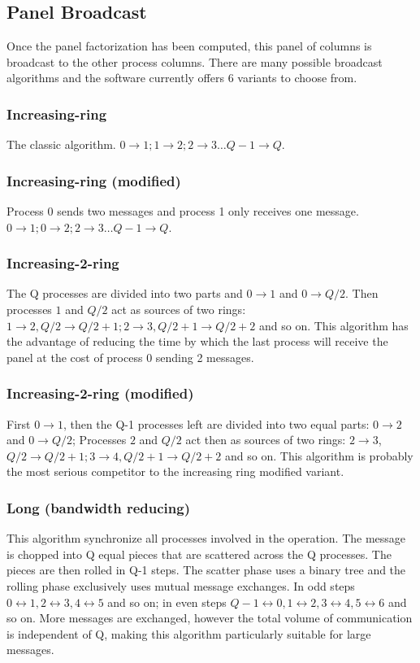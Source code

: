 \documentclass[a4paper, 11pt]{article}
\begin{document}
\subsection{Panel Broadcast}

Once the panel factorization has been computed, this panel of columns is broadcast to the other process columns. There are many possible broadcast algorithms and the software currently offers 6 variants to choose from.

\subsubsection{Increasing-ring}
The classic algorithm. $0 \rightarrow 1; 1 \rightarrow 2; 2 \rightarrow 3 \dots Q-1 \rightarrow Q$.

\subsubsection{Increasing-ring (modified)}
Process 0 sends two messages and process 1 only receives one message. $0 \rightarrow 1; 0 \rightarrow 2; 2 \rightarrow 3 \dots Q-1 \rightarrow Q$. 

\subsubsection{Increasing-2-ring}
The Q processes are divided into two parts and $0 \rightarrow 1$ and $0 \rightarrow Q/2$. Then processes $1$ and $Q/2$ act as sources of two rings: $1 \rightarrow 2, Q/2 \rightarrow Q/2+1; 2 \rightarrow 3, Q/2+1 \rightarrow Q/2+2$ and so on. This algorithm has the advantage of reducing the time by which the last process will receive the panel at the cost of process $0$ sending 2 messages.

\subsubsection{Increasing-2-ring (modified)}
First $0 \rightarrow 1$, then the Q-1 processes left are divided into two equal parts: $0 \rightarrow 2$ and $0 \rightarrow Q/2$; Processes $2$ and $Q/2$ act then as sources of two rings: $2 \rightarrow 3$, $Q/2 \rightarrow Q/2+1; 3 \rightarrow 4, Q/2+1 \rightarrow Q/2+2$ and so on. This algorithm is probably the most serious competitor to the increasing ring modified variant.

\subsubsection{Long (bandwidth reducing)}
This algorithm synchronize all processes involved in the operation. The message is chopped into Q equal pieces that are scattered across the Q processes. The pieces are then rolled in Q-1 steps. The scatter phase uses a binary tree and the rolling phase exclusively uses mutual message exchanges. In odd steps $0 \leftrightarrow 1, 2 \leftrightarrow 3, 4 \leftrightarrow 5$ and so on; in even steps $Q-1 \leftrightarrow 0, 1 \leftrightarrow 2, 3 \leftrightarrow 4, 5 \leftrightarrow 6$ and so on. More messages are exchanged, however the total volume of communication is independent of Q, making this algorithm particularly suitable for large messages.
\end{document}
